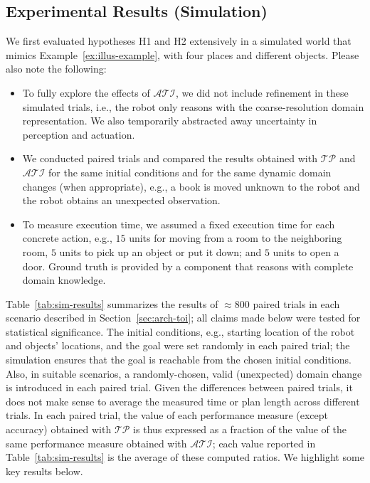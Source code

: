 \documentclass[letterpaper, 10 pt, conference]{ieeeconf}  %
\begin{document}
\subsection{Experimental Results (Simulation)}
\label{sec:expres-sim}
We first evaluated hypotheses H1 and H2 extensively in a simulated
world that mimics Example~\ref{ex:illus-example}, with four places and
different objects. Please also note the following:
\begin{itemize}
\item To fully explore the effects of $\mathcal{ATI}$, we did not
  include refinement in these simulated trials, i.e., the robot only
  reasons with the coarse-resolution domain representation. We also
  temporarily abstracted away uncertainty in perception and actuation.

\item We conducted paired trials and compared the results obtained
  with $\mathcal{TP}$ and $\mathcal{ATI}$ for the same initial
  conditions and for the same dynamic domain changes (when
  appropriate), e.g., a book is moved unknown to the robot and the
  robot obtains an unexpected observation.

\item To measure execution time, we assumed a fixed execution time for
  each concrete action, e.g., $15$ units for moving from a room to the
  neighboring room, $5$ units to pick up an object or put it down; and
  $5$ units to open a door. Ground truth is provided by a component
  that reasons with complete domain knowledge.
\end{itemize}
Table~\ref{tab:sim-results} summarizes the results of $\approx 800$
paired trials in each scenario described in
Section~\ref{sec:arch-toi}; all claims made below were tested for
statistical significance. The initial conditions, e.g., starting
location of the robot and objects' locations, and the goal were set
randomly in each paired trial; the simulation ensures that the goal is
reachable from the chosen initial conditions. Also, in suitable
scenarios, a randomly-chosen, valid (unexpected) domain change is
introduced in each paired trial. Given the differences between paired
trials, it does not make sense to average the measured time or plan
length across different trials. In each paired trial, the value of
each performance measure (except accuracy) obtained with
$\mathcal{TP}$ is thus expressed as a fraction of the value of the
same performance measure obtained with $\mathcal{ATI}$; each value
reported in Table~\ref{tab:sim-results} is the average of these
computed ratios. We highlight some key results below.
\end{document}
